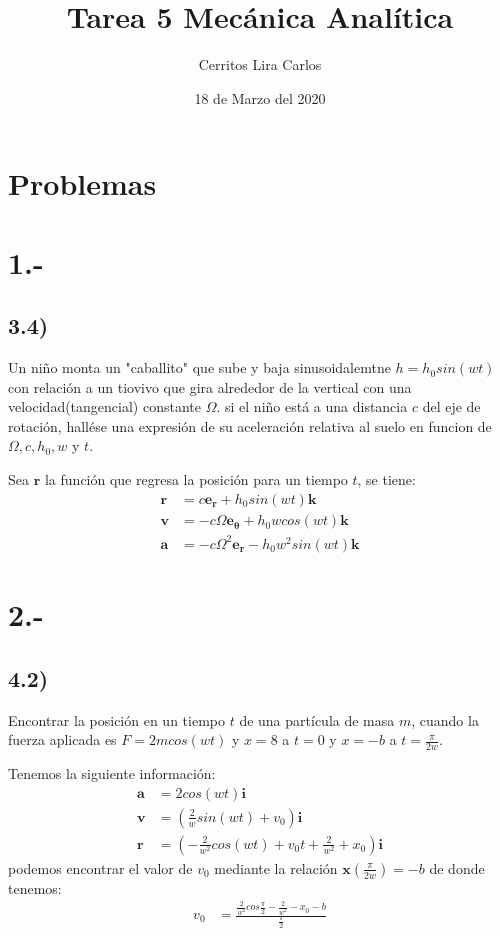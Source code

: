 \documentclass{article}
\title{Tarea 5 Mecánica Analítica}
\author{Cerritos Lira Carlos}
\date{18 de Marzo del 2020}
\begin{document}
\maketitle
\section*{Problemas}
\section*{1.-}
\subsection*{3.4)}
Un niño monta un "caballito" que sube y baja sinusoidalemtne $h=h_0sin(wt)$ con 
relación a un tiovivo que gira alrededor de la vertical con una velocidad(tangencial)
constante $\Omega$. si el niño está a una distancia $c$ del eje de rotación, 
hallése una expresión de su aceleración relativa al suelo en funcion de $\Omega, c, h_0, w$ 
y $t$. 
\begin{tcolorbox}[breakable]
    Sea $\bm{r}$ la función que regresa la posición para un tiempo $t$, se tiene:
    \begin{align*}
        \bm{r} &= c\bm{e_r} + h_0sin(wt)\bm{k} \\
        \bm{v} &= -c\Omega\bm{e_\theta} + h_0wcos(wt)\bm{k} \\
        \bm{a} &= -c\Omega^2\bm{e_r} - h_0w^2sin(wt)\bm{k} 
    \end{align*}
\end{tcolorbox}

\section*{2.-}
\subsection*{4.2)}
Encontrar la posición en un tiempo $t$ de una partícula de masa $m$, cuando la fuerza aplicada
es $F=2mcos(wt)$ y $x=8$ a $t=0$ y $x=-b$ a $t=\frac{\pi}{2w}$.
\begin{tcolorbox}[breakable]
    Tenemos la siguiente información:
    \begin{align*}
        \bm{a} &= 2cos(wt) \bm{i} \\
        \bm{v} &= \left(\frac{2}{w}sin(wt) + v_0 \right)\bm{i} \\ 
        \bm{r} &= \left(-\frac{2}{w^2}cos(wt) + v_0t + \frac{2}{w^2} + x_0 \right) \bm{i}
    \end{align*}
    podemos encontrar el valor de $v_0$ mediante la relación $\bm{x}(\frac{\pi}{2w}) = -b$
    de donde tenemos:
    \begin{align*}
        v_0 &= \frac{\frac{2}{w^2}cos\frac{\pi}{2} - \frac{2}{w^2} - x_0 - b}{\frac{\pi}{2}}
    \end{align*}
\end{tcolorbox}
\end{document}
